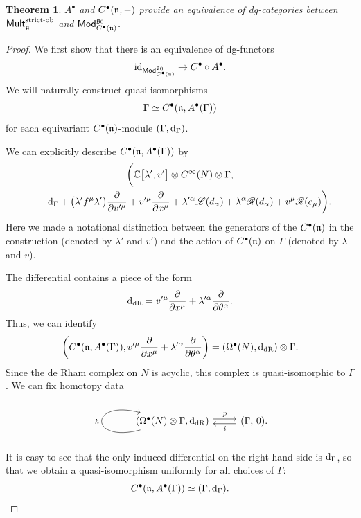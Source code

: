 \documentclass[pdftex]{sigma}
\numberwithin{equation}{section}
\newtheorem{thm}{Theorem}[section]
\def\cat#1{\ensuremath{\mathsf{#1}}}
\DeclareMathOperator{\Mod}{\cat{Mod}}
\DeclareMathOperator{\Mult}{\cat{Mult}}
\def\bu{\bullet}
\def\d{{\rm d}}
\def\sL{\mathscr L}
\def\sR{\mathscr R}
\begin{document}
\begin{thm} \label{thm: equiv}
	$A^\bullet$ and $C^\bullet(\mathfrak n , - )$ provide an equivalence of dg-categories between $\Mult_\fg^{\text{\rm strict-ob}}$ and $\Mod^{\fg_0}_{C^\bullet({\fn})}$.
\end{thm}
\begin{proof}
	We first show that there is an equivalence of dg-functors
	\begin{equation*}
	\mathrm{id}_{\Mod^{\fg_0}_{C^\bullet({\fn})}} \to C^\bullet \circ A^\bullet .
	\end{equation*}
	We will naturally construct quasi-isomorphisms
	\begin{equation*}
	\Gamma \simeq C^\bu(\fn,A^\bu(\Gamma))
	\end{equation*}
	for each equivariant $C^\bu(\fn)$-module $(\Gamma,\d_\Gamma)$.
	
	We can explicitly describe $C^\bu(\fn,A^\bu(\Gamma))$ by
	\begin{gather*}
	\bigg( \CC\big[\lambda', v'\big] \otimes C^\infty(N) \otimes \Gamma ,\\
\qquad{}  \d_\Gamma + \big(\lambda' f^\mu \lambda'\big) \frac{\partial}{\partial v'^\mu} + v'^\mu \frac{\partial}{\partial x^\mu} + \lambda'^\alpha \sL(d_\alpha) + \lambda^\alpha \sR(d_\alpha) + v^\mu \sR(e_\mu) \bigg) .
	\end{gather*}
	Here we made a notational distinction between the generators of the $C^\bullet(\mathfrak n)$ in the construction (denoted by $\lambda'$ and $v'$) and the action of $C^\bullet(\mathfrak n)$ on $\Gamma$ (denoted by $\lambda$ and $v$).
	
	The differential contains a piece of the form
	\begin{equation*}
	\d_{\mathrm{dR}} = v'^\mu \frac{\partial}{\partial x^\mu} + \lambda'^\alpha \frac{\partial}{\partial \theta^\alpha} .
	\end{equation*}
	Thus, we can identify
	\begin{equation*}
	\left( C^\bu(\fn,A^\bu(\Gamma)) , v'^\mu \frac{\partial}{\partial x^\mu} + \lambda'^\alpha \frac{\partial}{\partial \theta^\alpha} \right) = \left( \Omega^\bu(N) , \d_{\mathrm{dR}} \right) \otimes \Gamma .
	\end{equation*}
	Since the de Rham complex on $N$ is acyclic, this complex is quasi-isomorphic to $\Gamma$. We can fix homotopy data
	\begin{equation*}
	\begin{tikzcd}
	\arrow[loop left]{l}{h} \left( \Omega^\bu(N) \otimes \Gamma , \d_{\mathrm{dR}} \right) \arrow[r, shift left, "p"] & (\Gamma , \, 0)\arrow[l, shift left, "i"] .
	\end{tikzcd}
	\end{equation*}
	It is easy to see that the only induced differential on the right hand side is $\d_\Gamma$, so that we obtain a quasi-isomorphism uniformly for all choices of $\Gamma$:
	\begin{equation*}
	C^\bu(\fn,A^\bu(\Gamma)) \simeq (\Gamma , \d_\Gamma) .
	\end{equation*}
	

\end{proof}
\end{document}
